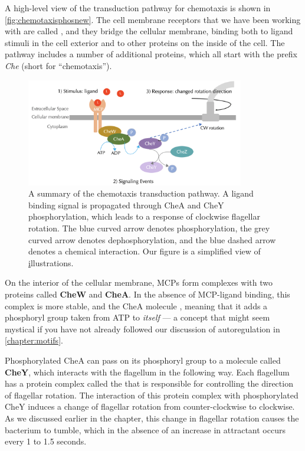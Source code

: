A high-level view of the transduction pathway for chemotaxis is shown in \autoref{fig:chemotaxisphosnew}. The cell membrane receptors that we have been working with are called , and they bridge the cellular membrane, binding both to ligand stimuli in the cell exterior and to other proteins on the inside of the cell. The pathway includes a number of additional proteins, which all start with the prefix \textit{Che} (short for ``chemotaxis'').

\begin{figure}[h]
\centering
\mySfFamily
\includegraphics[width = 0.85\textwidth]{../images/chemotaxisphosnew.png}
\caption{A summary of the chemotaxis transduction pathway. A ligand binding signal is propagated through CheA and CheY phosphorylation, which leads to a response of clockwise flagellar rotation. The blue curved arrow denotes phosphorylation, the grey curved arrow denotes dephosphorylation, and the blue dashed arrow denotes a chemical interaction. Our figure is a simplified view of \href{http://chemotaxis.biology.utah.edu/Parkinson_Lab/projects/ecolichemotaxis/ecolichemotaxis.html} illustrations.}
\label{fig:chemotaxisphosnew}
\end{figure}


On the interior of the cellular membrane, MCPs form complexes with two proteins called \textbf{CheW} and \textbf{CheA}. In the absence of MCP-ligand binding, this complex is more stable, and the CheA molecule , meaning that it adds a phosphoryl group taken from ATP to \textit{itself} --- a concept that might seem mystical if you have not already followed our discussion of autoregulation in \autoref{chapter:motifs}.

Phosphorylated CheA can pass on its phosphoryl group to a molecule called \textbf{CheY}, which interacts with the flagellum in the following way. Each flagellum has a protein complex called the  that is responsible for controlling the direction of flagellar rotation. The interaction of this protein complex with phosphorylated CheY induces a change of flagellar rotation from counter-clockwise to clockwise. As we discussed earlier in the chapter, this change in flagellar rotation causes the bacterium to tumble, which in the absence of an increase in attractant occurs every 1 to 1.5 seconds.

